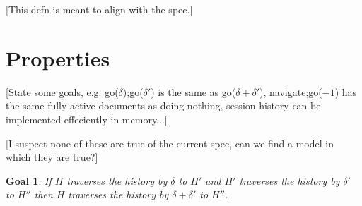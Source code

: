 \documentclass{article}
\newtheorem{goal}{Goal}
\begin{document}
[This defn is meant to align with the spec.]
    
\section{Properties}


[State some goals, e.g. go($\delta$);go($\delta'$) is the same as go($\delta+\delta'$),
  navigate;go($-1$) has the same fully active documents as doing nothing,
  session history can be implemented effeciently in memory...]

[I suspect none of these are true of the current spec, can we find a model in which
  they are true?]

\begin{goal}
\label{goal:homomorphism}
  If $H$ traverses the history by $\delta$ to $H'$
  and $H'$ traverses the history by $\delta'$ to $H''$
  then $H$ traverses the history by $\delta+\delta'$ to $H''$.
\end{goal}
\end{document}
